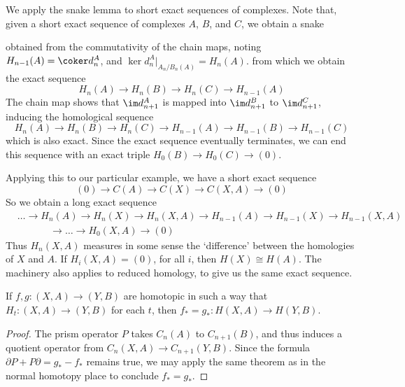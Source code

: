We apply the snake lemma to short exact sequences of complexes. Note that, given a short exact sequence of complexes $A$, $B$, and $C$, we obtain a snake
%
\begin{center}
\end{center}
%
obtained from the commutativity of the chain maps, noting $H_{n-1}(A) = \coker d_n^A$, and $\ker d_n^A|_{A_n/B_n(A)} = H_n(A)$.
%
from which we obtain the exact sequence
%
\[ H_n(A) \to H_n(B) \to H_n(C) \to H_{n-1}(A) \]
%
The chain map shows that $\im d_{n+1}^A$ is mapped into $\im d_{n+1}^B$ to $\im d_{n+1}^C$, inducing the homological sequence
%
\[ H_n(A) \to H_n(B) \to H_n(C) \to H_{n-1}(A) \to H_{n-1}(B) \to H_{n-1}(C) \]
%
which is also exact. Since the exact sequence eventually terminates, we can end this sequence with an exact triple $H_0(B) \to H_0(C) \to (0)$.

Applying this to our particular example, we have a short exact sequence
%
\[ (0) \to C(A) \to C(X) \to C(X,A) \to (0) \]
%
So we obtain a long exact sequence
%
\begin{align*}
    &\dots \to H_n(A) \to H_n(X) \to H_n(X,A) \to H_{n-1}(A) \to H_{n-1}(X) \to H_{n-1}(X,A)\\
    &\ \ \ \ \ \ \ \ \ \ \ \ \ \ \ \to \dots \to H_0(X,A) \to (0)
\end{align*}
%
Thus $H_n(X,A)$ measures in some sense the `difference' between the homologies of $X$ and $A$. If $H_i(X,A) = (0)$, for all $i$, then $H(X) \cong H(A)$. The machinery also applies to reduced homology, to give us the same exact sequence.

\begin{theorem}
    If $f,g: (X,A) \to (Y,B)$ are homotopic in such a way that $H_t: (X,A) \to (Y,B)$ for each $t$, then $f_* = g_*: H(X,A) \to H(Y,B)$.
\end{theorem}
\begin{proof}
    The prism operator $P$ takes $C_n(A)$ to $C_{n+1}(B)$, and thus induces a quotient operator from $C_n(X,A) \to C_{n+1}(Y,B)$. Since the formula $\partial P + P \partial = g_* - f_*$ remains true, we may apply the same theorem as in the normal homotopy place to conclude $f_* = g_*$.
\end{proof}

